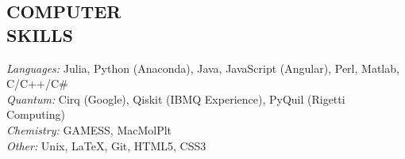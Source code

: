 \documentclass[overlapped, 10pt]{res} %
\begin{document}
\begin{resume}
\section{COMPUTER\\SKILLS}

{\sl Languages:} Julia, Python (Anaconda), Java, JavaScript (Angular), Perl, Matlab, C/C++/C\# \\
{\sl Quantum:} Cirq (Google), Qiskit (IBMQ Experience), PyQuil (Rigetti Computing) \\
{\sl Chemistry:} GAMESS, MacMolPlt \\
{\sl Other:} Unix, LaTeX, Git, HTML5, CSS3


\end{resume}
\end{document}
